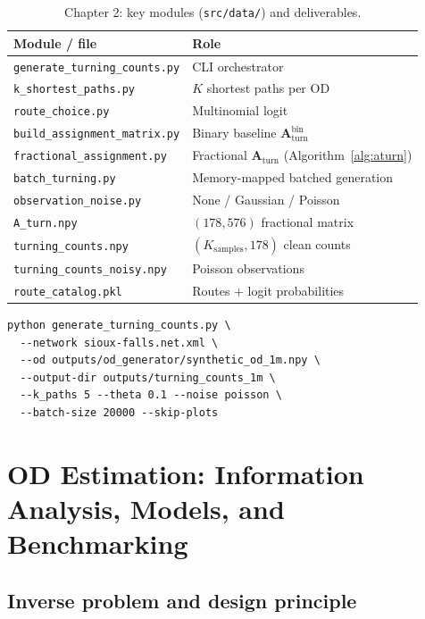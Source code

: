 \documentclass[11pt,a4paper]{report}
\newcommand{\Aturn}{\mathbf{A}_{\mathrm{turn}}}
\begin{document}
\begin{table}[ht]
\centering
\caption{Chapter 2: key modules (\texttt{src/data/}) and deliverables.}
\label{tab:impl2}
\small
\begin{tabular}{@{}ll@{}}
\toprule
\textbf{Module / file} & \textbf{Role} \\
\midrule
\texttt{generate\_turning\_counts.py} & CLI orchestrator \\
\texttt{k\_shortest\_paths.py} & $K$ shortest paths per OD \\
\texttt{route\_choice.py} & Multinomial logit \\
\texttt{build\_assignment\_matrix.py} & Binary baseline $\Aturn^{\mathrm{bin}}$ \\
\texttt{fractional\_assignment.py} & Fractional $\Aturn$ (Algorithm~\ref{alg:aturn}) \\
\texttt{batch\_turning.py} & Memory-mapped batched generation \\
\texttt{observation\_noise.py} & None / Gaussian / Poisson \\
\midrule
\texttt{A\_turn.npy} & $(178,576)$ fractional matrix \\
\texttt{turning\_counts.npy} & $(K_{\mathrm{samples}},178)$ clean counts \\
\texttt{turning\_counts\_noisy.npy} & Poisson observations \\
\texttt{route\_catalog.pkl} & Routes + logit probabilities \\
\bottomrule
\end{tabular}
\end{table}

\begin{verbatim}
python generate_turning_counts.py \
  --network sioux-falls.net.xml \
  --od outputs/od_generator/synthetic_od_1m.npy \
  --output-dir outputs/turning_counts_1m \
  --k_paths 5 --theta 0.1 --noise poisson \
  --batch-size 20000 --skip-plots
\end{verbatim}


\chapter{OD Estimation: Information Analysis, Models, and Benchmarking}
\label{ch:ml}

\section{Inverse problem and design principle}
\label{sec:ch3-inverse}
\end{document}
